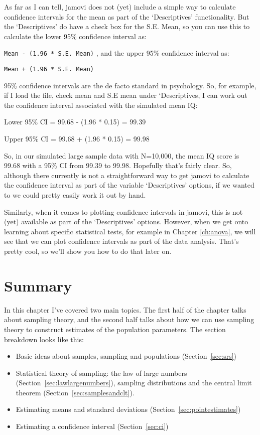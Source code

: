 As far as I can tell, jamovi does not (yet) include a simple way to  calculate confidence intervals for the mean as part of the `Descriptives' functionality. But the `Descriptives' do have a check box for the S.E. Mean, so you can use this to calculate the lower 95\% confidence interval as:

\texttt{Mean - (1.96 * S.E. Mean)} , and the upper 95\% confidence interval as:

\texttt{Mean + (1.96 * S.E. Mean)} 

95\% confidence intervals are the de facto standard in psychology. So, for example, if I load the  file, check mean and S.E mean under `Descriptives, I can work out the confidence interval associated with the simulated mean IQ: 

Lower 95\% CI = 99.68 - (1.96 * 0.15) = 99.39

Upper 95\% CI = 99.68 + (1.96 * 0.15) = 99.98 

So, in our simulated large sample data with N=10,000, the mean IQ score is 99.68 with a 95\% CI from 99.39 to 99.98. Hopefully that's fairly clear. So, although there currently is not a straightforward way to get jamovi to calculate the confidence interval as part of the variable `Descriptives' options, if we wanted to we could pretty easily work it out by hand. 

Similarly, when it comes to plotting confidence intervals in jamovi, this is not (yet) available as part of the `Descriptives' options. However, when we get onto learning about specific statistical tests, for example in Chapter  \ref{ch:anova}, we will see that we can plot confidence intervals as part of the data analysis. That's pretty cool, so we'll show you how to do that later on.


\section{Summary}

In this chapter I've covered two main topics. The first half of the chapter talks about sampling theory, and the second half talks about how we can use sampling theory to construct estimates of the population parameters. The section breakdown looks like this:

\begin{itemize} \itemsep -2pt
\item Basic ideas about samples, sampling and populations (Section~\ref{sec:srs})
\item Statistical theory of sampling: the law of large numbers (Section~\ref{sec:lawlargenumbers}), sampling distributions and the central limit theorem (Section~\ref{sec:samplesandclt}).
\item Estimating means and standard deviations (Section~\ref{sec:pointestimates})
\item Estimating a confidence interval (Section~\ref{sec:ci})
\end{itemize}

